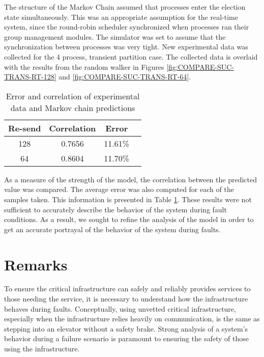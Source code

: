 The structure of the Markov Chain assumed that processes enter the election state simultaneously.
This was an appropriate assumption for the real-time system, since the round-robin scheduler synchronized when processes ran their group management modules.
The simulator was set to assume that the synchronization between processes was very tight.
New experimental data was collected for the 4 process, transient partition case.
The collected data is overlaid with the results from the random walker in Figures \ref{fig:COMPARE-SUC-TRANS-RT-128} and \ref{fig:COMPARE-SUC-TRANS-RT-64}.

\begin{table}
\caption{Error and correlation of experimental data and Markov chain predictions}
\label{tab:STAT-DATA}
\centering
\begin{tabular}{|c||c|c|c|}
\hline
Re-send & Correlation & Error \\ \hline
128 & 0.7656 & 11.61\% \\ \hline
64 & 0.8604 & 11.70\% \\ \hline
\end{tabular}
\end{table}

As a measure of the strength of the model, the correlation between the predicted value was compared.
The average error was also computed for each of the samples taken.
This information is presented in Table \ref{tab:STAT-DATA}.
These results were not sufficient to accurately describe the behavior of the system during fault conditions.
As a result, we sought to refine the analysis of the model in order to get an accurate portrayal of the behavior of the system during faults.

\section{Remarks}

To ensure the critical infrastructure can safely and reliably provides services to those needing the service, it is necessary to understand how the infrastructure behaves during faults.
Conceptually, using unvetted critical infrastructure, especially when the infrastructure relies heavily on communication, is the same as stepping into an elevator without a safety brake.
Strong analysis of a system's behavior during a failure scenario is paramount to ensuring the safety of those using the infrastructure.

